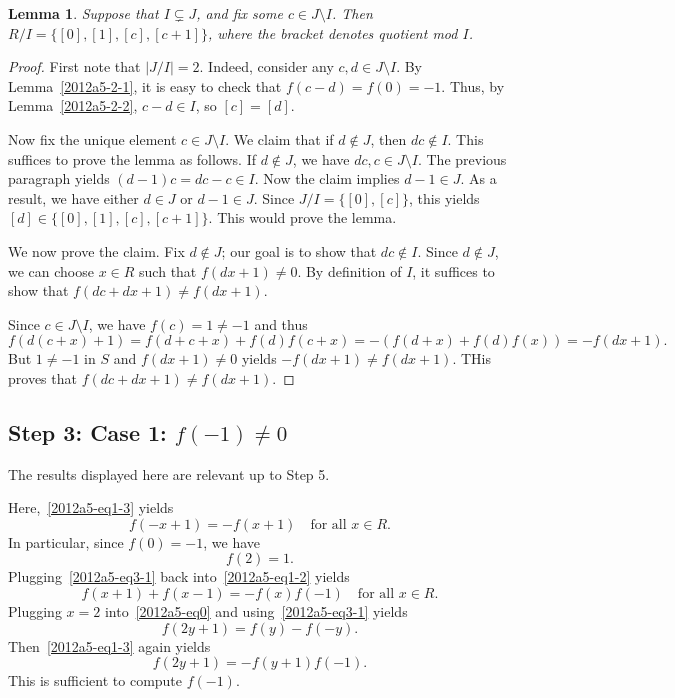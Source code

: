 \documentclass{article}
\newtheorem{lemma}{Lemma}
\begin{document}
\begin{lemma}\label{2012a5-2-3}
Suppose that $I \subsetneq J$, and fix some $c \in J \setminus I$.
Then $R/I = \{[0], [1], [c], [c + 1]\}$, where the bracket denotes quotient mod $I$.
\end{lemma}
\begin{proof}
First note that $|J/I| = 2$.
Indeed, consider any $c, d \in J \setminus I$.
By Lemma~\ref{2012a5-2-1}, it is easy to check that $f(c - d) = f(0) = -1$.
Thus, by Lemma~\ref{2012a5-2-2}, $c - d \in I$, so $[c] = [d]$.

Now fix the unique element $c \in J \setminus I$.
We claim that if $d \notin J$, then $dc \notin I$.
This suffices to prove the lemma as follows.
If $d \notin J$, we have $dc, c \in J \setminus I$.
The previous paragraph yields $(d - 1) c = dc - c \in I$.
Now the claim implies $d - 1 \in J$.
As a result, we have either $d \in J$ or $d - 1 \in J$.
Since $J/I = \{[0], [c]\}$, this yields $[d] \in \{[0], [1], [c], [c + 1]\}$.
This would prove the lemma.

We now prove the claim.
Fix $d \notin J$; our goal is to show that $dc \notin I$.
Since $d \notin J$, we can choose $x \in R$ such that $f(dx + 1) \neq 0$.
By definition of $I$, it suffices to show that $f(dc + dx + 1) \neq f(dx + 1)$.

Since $c \in J \setminus I$, we have $f(c) = 1 \neq -1$ and thus
\[ f(d(c + x) + 1) = f(d + c + x) + f(d) f(c + x) = -(f(d + x) + f(d) f(x)) = -f(dx + 1). \]
But $1 \neq -1$ in $S$ and $f(dx + 1) \neq 0$ yields $-f(dx + 1) \neq f(dx + 1)$.
THis proves that $f(dc + dx + 1) \neq f(dx + 1)$.
\end{proof}









\subsection*{Step 3: Case 1: $f(-1) \neq 0$}

The results displayed here are relevant up to Step 5.

Here,~\eqref{2012a5-eq1-3} yields
\[ f(-x + 1) = -f(x + 1) \quad \text{for all } x \in R. \tag{3.1}\label{2012a5-eq3-1} \]
In particular, since $f(0) = -1$, we have
\[ f(2) = 1. \tag{3.2}\label{2012a5-eq3-2} \]
Plugging~\eqref{2012a5-eq3-1} back into~\eqref{2012a5-eq1-2} yields
\[ f(x + 1) + f(x - 1) = -f(x) f(-1) \quad \text{for all } x \in R. \tag{3.3}\label{2012a5-eq3-3} \]
Plugging $x = 2$ into~\eqref{2012a5-eq0} and using~\eqref{2012a5-eq3-1} yields
\[ f(2y + 1) = f(y) - f(-y). \tag{3.4}\label{2012a5-eq3-4} \]
Then~\eqref{2012a5-eq1-3} again yields
\[ f(2y + 1) = -f(y + 1) f(-1). \tag{3.5}\label{2012a5-eq3-5} \]
This is sufficient to compute $f(-1)$.
\end{document}
